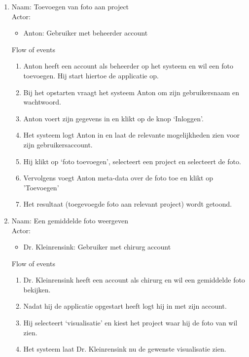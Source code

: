 \begin{enumerate}

\item   Naam: Toevoegen van foto aan project \\
	Actor:
	\begin{itemize}
		\item Anton: Gebruiker met beheerder account
	\end{itemize}
	Flow of events
	\begin{enumerate}
        \item Anton heeft een account als beheerder op het systeem en wil een foto toevoegen. Hij start hiertoe de applicatie op.
        \item Bij het opstarten vraagt het systeem Anton om zijn gebruikersnaam en wachtwoord.
        \item Anton voert zijn gegevens in en klikt op de knop `Inloggen'.
        \item Het systeem logt Anton in en laat de relevante mogelijkheden zien voor zijn gebruikersaccount.
				\item Hij klikt op `foto toevoegen', selecteert een project en selecteert de foto.
				\item Vervolgens voegt Anton meta-data over de foto toe en klikt op 'Toevoegen' 
				\item Het resultaat (toegevoegde foto aan relevant project) wordt getoond.
    \end{enumerate}

\item   Naam: Een gemiddelde foto weergeven \\
	Actor:
	\begin{itemize}
		\item Dr. Kleinrensink: Gebruiker met chirurg account
	\end{itemize}
	Flow of events
	\begin{enumerate}
	\item Dr. Kleinrensink heeft een account als chirurg en wil een gemiddelde foto bekijken.
	\item Nadat hij de applicatie opgestart heeft logt hij in met zijn account.
	\item Hij selecteert `visualisatie' en kiest het project waar hij de foto van wil zien.
	\item Het systeem laat Dr. Kleinrensink nu de gewenste visualisatie zien.
	\end{enumerate}
\end{enumerate}

